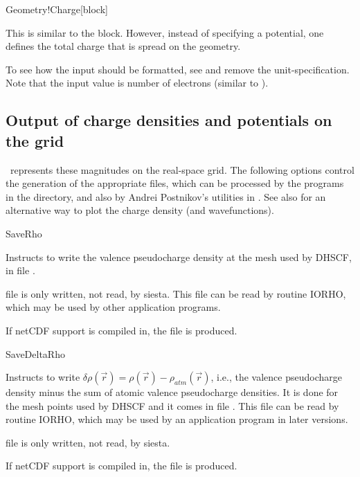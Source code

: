 \begin{fdfentry}{Geometry!Charge}[block]%

  This is similar to the  block. However,
  instead of specifying a potential, one defines the total charge that
  is spread on the geometry. 

  To see how the input should be formatted, see
   and remove the unit-specification. Note that
  the input value is number of electrons (similar to ).
  
\end{fdfentry}




\subsection{Output of charge densities and potentials on the grid}

\siesta\ represents these magnitudes on the real-space grid. The
following options control the generation of the appropriate files,
which can be processed by the programs in the 
directory, and also by Andrei Postnikov's utilities in
. See also  for
an alternative way to plot the charge density (and wavefunctions).

\begin{fdflogicalF}{SaveRho}

  Instructs to write the valence pseudocharge density at the mesh used
  by DHSCF, in file .

  \note file  is only written, not read, by siesta.
  This file can be read by routine IORHO, which may be used by other
  application programs.

  If netCDF support is compiled in, the file  is
  produced.
  
\end{fdflogicalF}

\begin{fdflogicalF}{SaveDeltaRho}

  Instructs to write
  $\delta \rho(\vec r) = \rho(\vec r) - \rho_{atm}(\vec r)$, i.e., the
  valence pseudocharge density minus the sum of atomic valence
  pseudocharge densities. It is done for the mesh points used by DHSCF
  and it comes in file . This file can be
  read by routine IORHO, which may be used by an application program
  in later versions.

  \note file  is only written, not read, by siesta.

  If netCDF support is compiled in, the file 
  is produced.

\end{fdflogicalF}

